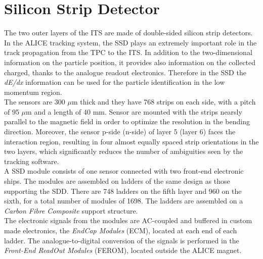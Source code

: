 \section{Silicon Strip Detector}
The two outer layers of the ITS are made of double-sided silicon strip detectors. In the ALICE tracking system, the SSD plays an extremely important role in the track propagation from the TPC to the ITS. In addition to the two-dimensional information on the particle position, it provides also information on the collected charged, thanks to the analogue readout electronics. Therefore in the SSD the \textit{dE/dx} information can be used for the particle identification in the low momentum region.\\
The sensors are 300 $\mu$m thick and they have 768 strips on each side, with a pitch of 95 $\mu$m and a length of 40 mm. Sensor are mounted with the strips nearsly parallel to the magnetic field in order to optimize the resolution in the bending direction. Moreover, the sensor p-side (n-side) of layer 5 (layer 6) faces the interaction region, resulting in four almost equally spaced strip orientations in the two layers, which significantly reduces the number of ambiguities seen by the tracking software.\\
A SSD module consists of one sensor connected with two front-end electronic ships. The modules are assembled on ladders of the same design as those supporting the SDD. There are 748 ladders on the fifth layer and 960 on the sixth, for a total number of modules of 1698. The ladders are assembled on a \textit{Carbon Fibre Composite} support structure.\\
The electronic signals from the modules are AC-coupled and buffered in custom made electronics, the \textit{EndCap Modules} (ECM), located at each end of each ladder. The analogue-to-digital conversion of the signals is performed in the \textit{Front-End ReadOut Modules} (FEROM), located outside the ALICE magnet.